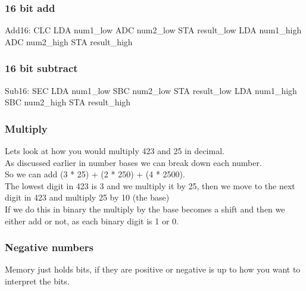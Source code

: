 \documentclass{ol-softwaremanual}
\begin{document}
\subsubsection{16 bit add}
\begin{ffcode}
Add16:
  CLC
  LDA num1_low
  ADC num2_low
  STA result_low
  LDA num1_high
  ADC num2_high
  STA result_high
\end{ffcode}

\subsubsection{16 bit subtract}
\begin{ffcode}
Sub16:
  SEC
  LDA num1_low
  SBC num2_low
  STA result_low
  LDA num1_high
  SBC num2_high
  STA result_high
\end{ffcode}

\subsubsection{Multiply}
Lets look at how you would multiply 423 and 25 in decimal.\\
As discussed earlier in number bases we can break down each number.\\ 
So we can add (3 * 25) + (2 * 250) + (4 * 2500).\\
The lowest digit in 423 is 3 and we multiply it by 25, then we move to the next digit in 423 and multiply 25 by 10 (the base)\\

If we do this in binary the multiply by the base becomes a shift and then we either add or not, as each binary digit is 1 or 0.


\pagebreak
\subsubsection{Negative numbers}
Memory just holds bits, if they are positive or negative is up to how you want to interpret the bits.\\
\end{document}
